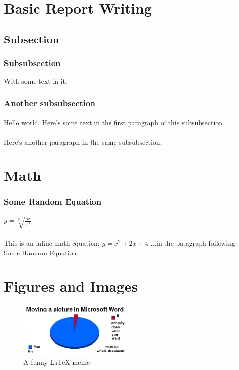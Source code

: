\documentclass{article}
\begin{document}
\section{Basic Report Writing}
\subsection{Subsection}
\subsubsection{Subsubsection}
With some text in it.
\subsubsection{Another subsubsection}
\paragraph{}
Hello world. Here's some text in the first paragraph of this subsubsection.
\paragraph{}
Here's another paragraph in the same subsubsection. 


\section{Math}
\subsubsection{Some Random Equation}
$y = \sqrt[3]{\frac{5x}{x^2}}$

\paragraph{}
This is an inline math equation: $y = x^2 + 2x + 4$ ...in the paragraph following Some Random Equation.


\section{Figures and Images}
\begin{figure}[h]
\caption{A funny LaTeX meme}
\centering
\includegraphics[width=0.5\textwidth]{latex-meme.jpg}
\end{figure}
\end{document}
